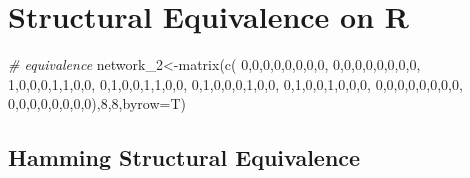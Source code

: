 \documentclass[
  notitlepage,
  onecolumn,
  openany]{book}
\newenvironment{Shaded}{\begin{snugshade}}{\end{snugshade}}
\newcommand{\AttributeTok}[1]{\textcolor[rgb]{0.77,0.63,0.00}{#1}}
\newcommand{\CommentTok}[1]{\textcolor[rgb]{0.56,0.35,0.01}{\textit{#1}}}
\newcommand{\DecValTok}[1]{\textcolor[rgb]{0.00,0.00,0.81}{#1}}
\newcommand{\FunctionTok}[1]{\textcolor[rgb]{0.00,0.00,0.00}{#1}}
\newcommand{\NormalTok}[1]{#1}
\newcommand{\OtherTok}[1]{\textcolor[rgb]{0.56,0.35,0.01}{#1}}
\begin{document}
\hypertarget{structural-equivalence-on-r}{%
\section{Structural Equivalence on R}\label{structural-equivalence-on-r}}

\begin{Shaded}
\begin{Highlighting}[]
\CommentTok{\# equivalence}
\NormalTok{network\_2}\OtherTok{\textless{}{-}}\FunctionTok{matrix}\NormalTok{(}\FunctionTok{c}\NormalTok{(}
  \DecValTok{0}\NormalTok{,}\DecValTok{0}\NormalTok{,}\DecValTok{0}\NormalTok{,}\DecValTok{0}\NormalTok{,}\DecValTok{0}\NormalTok{,}\DecValTok{0}\NormalTok{,}\DecValTok{0}\NormalTok{,}\DecValTok{0}\NormalTok{,}
  \DecValTok{0}\NormalTok{,}\DecValTok{0}\NormalTok{,}\DecValTok{0}\NormalTok{,}\DecValTok{0}\NormalTok{,}\DecValTok{0}\NormalTok{,}\DecValTok{0}\NormalTok{,}\DecValTok{0}\NormalTok{,}\DecValTok{0}\NormalTok{,}
  \DecValTok{1}\NormalTok{,}\DecValTok{0}\NormalTok{,}\DecValTok{0}\NormalTok{,}\DecValTok{0}\NormalTok{,}\DecValTok{1}\NormalTok{,}\DecValTok{1}\NormalTok{,}\DecValTok{0}\NormalTok{,}\DecValTok{0}\NormalTok{,}
  \DecValTok{0}\NormalTok{,}\DecValTok{1}\NormalTok{,}\DecValTok{0}\NormalTok{,}\DecValTok{0}\NormalTok{,}\DecValTok{1}\NormalTok{,}\DecValTok{1}\NormalTok{,}\DecValTok{0}\NormalTok{,}\DecValTok{0}\NormalTok{,}
  \DecValTok{0}\NormalTok{,}\DecValTok{1}\NormalTok{,}\DecValTok{0}\NormalTok{,}\DecValTok{0}\NormalTok{,}\DecValTok{0}\NormalTok{,}\DecValTok{1}\NormalTok{,}\DecValTok{0}\NormalTok{,}\DecValTok{0}\NormalTok{,}
  \DecValTok{0}\NormalTok{,}\DecValTok{1}\NormalTok{,}\DecValTok{0}\NormalTok{,}\DecValTok{0}\NormalTok{,}\DecValTok{1}\NormalTok{,}\DecValTok{0}\NormalTok{,}\DecValTok{0}\NormalTok{,}\DecValTok{0}\NormalTok{,}
  \DecValTok{0}\NormalTok{,}\DecValTok{0}\NormalTok{,}\DecValTok{0}\NormalTok{,}\DecValTok{0}\NormalTok{,}\DecValTok{0}\NormalTok{,}\DecValTok{0}\NormalTok{,}\DecValTok{0}\NormalTok{,}\DecValTok{0}\NormalTok{,}
  \DecValTok{0}\NormalTok{,}\DecValTok{0}\NormalTok{,}\DecValTok{0}\NormalTok{,}\DecValTok{0}\NormalTok{,}\DecValTok{0}\NormalTok{,}\DecValTok{0}\NormalTok{,}\DecValTok{0}\NormalTok{,}\DecValTok{0}\NormalTok{),}\DecValTok{8}\NormalTok{,}\DecValTok{8}\NormalTok{,}\AttributeTok{byrow=}\NormalTok{T)}
\end{Highlighting}
\end{Shaded}

\hypertarget{hamming-structural-equivalence}{%
\subsection{Hamming Structural Equivalence}\label{hamming-structural-equivalence}}
\end{document}
